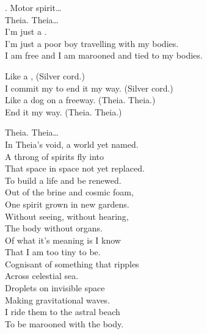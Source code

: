 
. Motor spirit… \\

Theia. Theia… \\

I'm just a . \\
I'm just a poor boy travelling with my bodies. \\
I am free and I am marooned and tied to my bodies. \\


Like a , (Silver cord.) \\
I commit my  to end it my way. (Silver cord.) \\

Like a dog on a freeway. (Theia. Theia.) \\
End it my way. (Theia. Theia.) \\


Theia. Theia… \\

In Theia's void, a world yet named. \\
A throng of spirits fly into \\
That space in space not yet replaced. \\
To build a life and be renewed. \\
Out of the brine and cosmic foam, \\
One spirit grown in new gardens. \\
Without seeing, without hearing, \\
The body without organs. \\

Of what it's meaning is I know \\
That I am too tiny to be. \\
Cognisant of something that ripples \\
Across celestial sea. \\
Droplets on invisible space \\
Making gravitational waves. \\
I ride them to the astral beach \\
To be marooned with the body. \\


